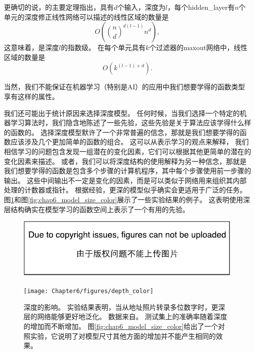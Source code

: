 更确切的说，\cite{Montufar-et-al-NIPS2014}的主要定理指出，具有$d$个输入，深度为$l$，每个\gls{hidden_layer}有$n$个单元的深度修正线性网络可以描述的线性区域的数量是
\begin{equation}
O \left ( {n \choose d}^{d(l-1)} n^d \right ),
\end{equation}
这意味着，是深度$l$的指数级。
在每个单元具有$k$个过滤器的maxout网络中，线性区域的数量是
\begin{equation}
O \left ( k^{(l-1)+d} \right ).
\end{equation}


当然，我们不能保证在机器学习（特别是AI）的应用中我们想要学得的函数类型享有这样的属性。

我们还可能出于统计原因来选择深度模型。
任何时候，当我们选择一个特定的机器学习算法时，我们隐含地陈述了一些先验，这些先验是关于算法应该学得什么样的函数的。
选择深度模型默许了一个非常普遍的信念，那就是我们想要学得的函数应该涉及几个更加简单的函数的组合。
这可以从表示学习的观点来解释， 我们相信学习的问题包含发现一组潜在的变化因素，它们可以根据其他更简单的潜在的变化因素来描述。
或者，我们可以将深度结构的使用解释为另一种信念，那就是我们想要学得的函数是包含多个步骤的计算机程序，其中每个步骤使用前一步骤的输出。
这些中间输出不一定是变化的因素，而是可以类似于网络用来组织其内部处理的计数器或指针。
根据经验，更深的模型似乎确实会更适用于广泛的任务\citep{Bengio-NIPS2007,Erhan2009,Bengio-2009-book,UTLC+LISA-2011-small,Ciresan-et-al-2012,Krizhevsky-2012-small,sermanet-cvpr-13,Farabet-et-al-2013,couprie-iclr-13,LISA-EmotiW2013,Goodfellow+et+al-ICLR2014a,Szegedy-et-al-arxiv2014}。
图\ref{fig:chap6_depth_color}和图\ref{fig:chap6_model_size_color}展示了一些实验结果的例子。
这表明使用深层结构确实在模型学习的函数空间上表示了一个有用的先验。
\begin{figure}[!htb]
\ifOpenSource
\centerline{\includegraphics{figure.pdf}}
\else
\centerline{\texttt{[image: Chapter6/figures/depth\_color]}}
\fi
\caption{深度的影响。
实验结果表明，当从地址照片转录多位数字时，更深层的网络能够更好地泛化。
数据来自\cite{Goodfellow+et+al-ICLR2014a}。
测试集上的准确率随着深度的增加而不断增加。
图\ref{fig:chap6_model_size_color}给出了一个对照实验，它说明了对模型尺寸其他方面的增加并不能产生相同的效果。}
\label{fig:chap6_depth_color}
\end{figure}

